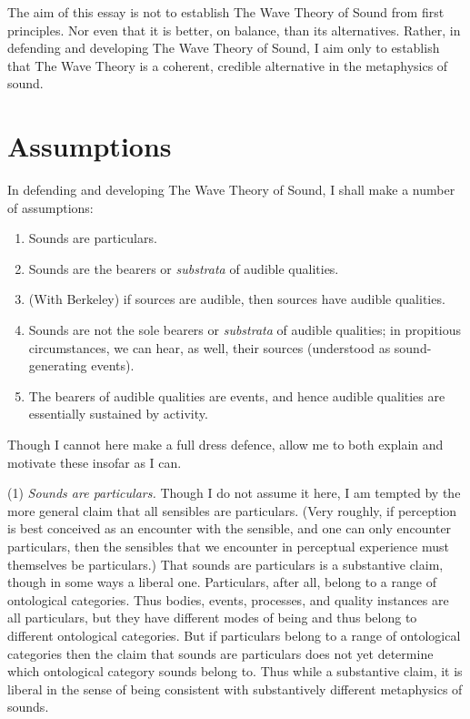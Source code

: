 \documentclass[12pt]{article}
\begin{document}
The aim of this essay is not to establish The Wave Theory of Sound from first principles. Nor even that it is better, on balance, than its alternatives. Rather, in defending and developing The Wave Theory of Sound, I aim only to establish that The Wave Theory is a coherent, credible alternative in the metaphysics of sound. 


\section{Assumptions} %
\label{sec:section_name}

In defending and developing The Wave Theory of Sound, I shall make a number of assumptions:
\begin{enumerate}[(1)]
	\item Sounds are particulars.
	\item Sounds are the bearers or \emph{substrata} of audible qualities.
	\item (With Berkeley) if sources are audible, then sources have audible qualities.
	\item Sounds are not the sole bearers or \emph{substrata} of audible qualities; in propitious circumstances, we can hear, as well, their sources (understood as sound-generating events).
	\item The bearers of audible qualities are events, and hence audible qualities are essentially sustained by activity.
\end{enumerate}
Though I cannot here make a full dress defence, allow me to both explain and motivate these insofar as I can.

(1) \emph{Sounds are particulars.} Though I do not assume it here, I am tempted by the more general claim that all sensibles are particulars. (Very roughly, if perception is best conceived as an encounter with the sensible, and one can only encounter particulars, then the sensibles that we encounter in perceptual experience must themselves be particulars.) That sounds are particulars is a substantive claim, though in some ways a liberal one. Particulars, after all, belong to a range of ontological categories. Thus bodies, events, processes, and quality instances are all particulars, but they have different modes of being and thus belong to different ontological categories. But if particulars belong to a range of ontological categories then the claim that sounds are particulars does not yet determine which ontological category sounds belong to. Thus while a substantive claim, it is liberal in the sense of being consistent with substantively different metaphysics of sounds. 
\end{document}
